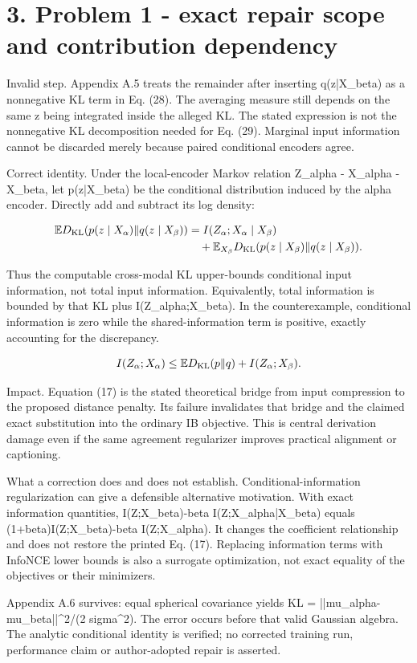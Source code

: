 \documentclass[10pt]{article}
\begin{document}
\section*{3. Problem 1 - exact repair scope and contribution dependency}
Invalid step. Appendix A.5 treats the remainder after inserting q(z|X\_beta) as a nonnegative KL term in Eq. (28). The averaging measure still depends on the same z being integrated inside the alleged KL. The stated expression is not the nonnegative KL decomposition needed for Eq. (29). Marginal input information cannot be discarded merely because paired conditional encoders agree.\par
Correct identity. Under the local-encoder Markov relation Z\_alpha - X\_alpha - X\_beta, let p(z|X\_beta) be the conditional distribution induced by the alpha encoder. Directly add and subtract its log density:\par
\[\begin{aligned}
\mathbb E D_{\rm KL}(p(z\mid X_\alpha)\|q(z\mid X_\beta))
&=I(Z_\alpha;X_\alpha\mid X_\beta)\\
&\quad+\mathbb E_{X_\beta}D_{\rm KL}(p(z\mid X_\beta)\|q(z\mid X_\beta)).
\end{aligned}\]\par
Thus the computable cross-modal KL upper-bounds conditional input information, not total input information. Equivalently, total information is bounded by that KL plus I(Z\_alpha;X\_beta). In the counterexample, conditional information is zero while the shared-information term is positive, exactly accounting for the discrepancy.\par
\[I(Z_\alpha;X_\alpha)\leq \mathbb E D_{\rm KL}(p\|q)+I(Z_\alpha;X_\beta).\]\par
Impact. Equation (17) is the stated theoretical bridge from input compression to the proposed distance penalty. Its failure invalidates that bridge and the claimed exact substitution into the ordinary IB objective. This is central derivation damage even if the same agreement regularizer improves practical alignment or captioning.\par
What a correction does and does not establish. Conditional-information regularization can give a defensible alternative motivation. With exact information quantities, I(Z;X\_beta)-beta I(Z;X\_alpha|X\_beta) equals (1+beta)I(Z;X\_beta)-beta I(Z;X\_alpha). It changes the coefficient relationship and does not restore the printed Eq. (17). Replacing information terms with InfoNCE lower bounds is also a surrogate optimization, not exact equality of the objectives or their minimizers.\par
Appendix A.6 survives: equal spherical covariance yields KL = ||mu\_alpha-mu\_beta||\textasciicircum{}2/(2 sigma\textasciicircum{}2). The error occurs before that valid Gaussian algebra. The analytic conditional identity is verified; no corrected training run, performance claim or author-adopted repair is asserted.\par
\end{document}
